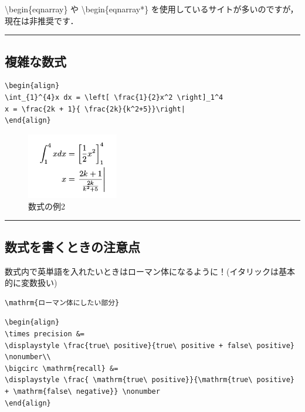 \textbackslash{}begin\{eqnarray\} や \textbackslash{}begin\{eqnarray*\}
を使用しているサイトが多いのですが，現在は非推奨です．

\begin{center}\rule{0.5\linewidth}{\linethickness}\end{center}

\hypertarget{ux8907ux96d1ux306aux6570ux5f0f}{\subsection{複雑な数式}\label{ux8907ux96d1ux306aux6570ux5f0f}}

\begin{lstlisting}
\begin{align}
\int_{1}^{4}x dx = \left[ \frac{1}{2}x^2 \right]_1^4
x = \frac{2k + 1}{ \frac{2k}{k^2+5}}\right|
\end{align}
\end{lstlisting}

\begin{figure}[htbp]
\centering
\includegraphics[width=4.00000cm]{./figures/align2.png}
\caption{数式の例2}
\end{figure}

\begin{center}\rule{0.5\linewidth}{\linethickness}\end{center}

\hypertarget{ux6570ux5f0fux3092ux66f8ux304fux3068ux304dux306eux6ce8ux610fux70b9}{\subsection{数式を書くときの注意点}\label{ux6570ux5f0fux3092ux66f8ux304fux3068ux304dux306eux6ce8ux610fux70b9}}

数式内で英単語を入れたいときはローマン体になるように！(イタリックは基本的に変数扱い)

\begin{lstlisting}
\mathrm{ローマン体にしたい部分}
\end{lstlisting}

\begin{lstlisting}
\begin{align}
\times precision &=
\displaystyle \frac{true\ positive}{true\ positive + false\ positive} \nonumber\\
\bigcirc \mathrm{recall} &=
\displaystyle \frac{ \mathrm{true\ positive}}{\mathrm{true\ positive} + \mathrm{false\ negative}} \nonumber
\end{align}
\end{lstlisting}

